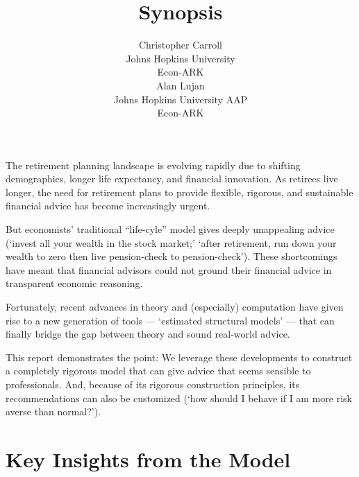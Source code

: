 \documentclass{article}
\title{Synopsis}
\date{\displaydate{articleDate}}
\author{Christopher Carroll\footnotemark[1]\\
Johns Hopkins University\\Econ-ARK\\\AND
Alan Lujan\\
Johns Hopkins University AAP\\Econ-ARK\\}
\begin{document}
\maketitle
{}


\keywords{}

The retirement planning landscape is evolving rapidly due to shifting demographics, longer life expectancy, and financial innovation. As retirees live longer, the need for retirement plans to provide flexible, rigorous, and sustainable financial advice has become increasingly urgent.

But economists' traditional ``life-cyle'' model gives deeply unappealing advice (`invest all your wealth in the stock market;' `after retirement, run down your wealth to zero then live pension-check to pension-check'). These shortcomings have meant that financial advisors could not ground their financial advice in transparent economic reasoning.

Fortunately, recent advances in theory and (especially) computation have given rise to a new generation of tools --- `estimated structural models' --- that can finally bridge the gap between theory and sound real-world advice.

This report demonstrates the point: We leverage these developments to construct a completely rigorous model that can give advice that seems sensible to professionals. And, because of its rigorous construction principles, its recommendations can also be customized (`how should I behave if I am more risk averse than normal?').

\section{Key Insights from the Model}
\end{document}
